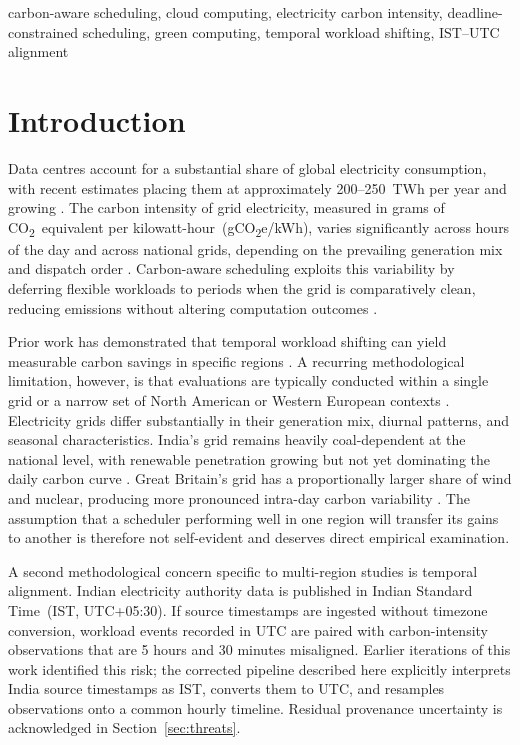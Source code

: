 \documentclass[conference]{IEEEtran}
\begin{document}
\begin{IEEEkeywords}
carbon-aware scheduling, cloud computing, electricity carbon intensity,
deadline-constrained scheduling, green computing, temporal workload shifting,
IST--UTC alignment
\end{IEEEkeywords}

\section{Introduction}
\label{sec:intro}

Data centres account for a substantial share of global electricity
consumption, with recent estimates placing them at approximately 200--250~TWh
per year and growing \cite{masanet2020recalibrating,iea2022datacenters}. The
carbon intensity of grid electricity, measured in grams of
CO\textsubscript{2}~equivalent per kilowatt-hour~(gCO\textsubscript{2}e/kWh),
varies significantly across hours of the day and across national grids,
depending on the prevailing generation mix and dispatch order
\cite{radovanovic2023,siler2012should}. Carbon-aware scheduling exploits this
variability by deferring flexible workloads to periods when the grid is
comparatively clean, reducing emissions without altering computation outcomes
\cite{radovanovic2023,acun2023}.

Prior work has demonstrated that temporal workload shifting can yield
measurable carbon savings in specific regions
\cite{wiesner2021,hanafy2024gaia,bahreini2023dispatcher}. A recurring
methodological limitation, however, is that evaluations are typically conducted
within a single grid or a narrow set of North American or Western European
contexts \cite{frachtenberg2023limitations}. Electricity grids differ
substantially in their generation mix, diurnal patterns, and seasonal
characteristics. India's grid remains heavily coal-dependent at the national
level, with renewable penetration growing but not yet dominating the daily
carbon curve \cite{cea2024,ceai2023general}. Great Britain's grid has a
proportionally larger share of wind and nuclear, producing more pronounced
intra-day carbon variability \cite{neso2024api}. The assumption that a
scheduler performing well in one region will transfer its gains to another is
therefore not self-evident and deserves direct empirical examination.

A second methodological concern specific to multi-region studies is temporal
alignment. Indian electricity authority data is published in Indian Standard
Time~(IST, UTC+05:30). If source timestamps are ingested without timezone
conversion, workload events recorded in UTC are paired with carbon-intensity
observations that are 5 hours and 30 minutes misaligned. Earlier iterations
of this work identified this risk; the corrected pipeline described here
explicitly interprets India source timestamps as IST, converts them to UTC, and
resamples observations onto a common hourly timeline. Residual provenance
uncertainty is acknowledged in Section~\ref{sec:threats}.
\end{document}
